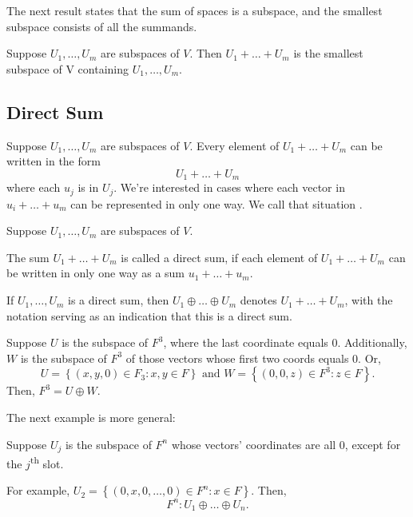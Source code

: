 The next result states that the sum of spaces is a subspace, and the smallest subspace consists of all the summands.
\begin{theorem}
  Suppose $U_{1}, \dots, U_{m}$ are subspaces of $V$. 
  Then $U_{1} + \dots + U_{m}$ is the smallest subspace of V containing $U_{1}, \dots, U_{m}$.
\end{theorem}

\subsection{Direct Sum}

Suppose $U_{1}, \dots, U_{m}$ are subspaces of $V$. 
Every element of $U_{1} + \dots + U_{m}$ can be written in the form 
\begin{equation*}
  U_{1} + \dots + U_{m}
\end{equation*}
where each $u_{j}$ is in $U_{j}$. 
We're interested in cases where each vector in $u_{i} + \dots + u_{m}$ can be represented in only one way.
We call that situation .

\begin{definition}
  Suppose $U_{1}, \dots, U_{m}$ are subspaces of $V$. 

  The sum $U_{1} + \dots + U_{m}$ is called a direct sum, if each element of $U_{1} + \dots + U_{m}$ can be written in only one way as a sum $u_{1} + \dots + u_{m}$.
  
  If $U_{1}, \dots, U_{m}$ is a direct sum, then $U_{1} \oplus \dots \oplus U_{m}$ denotes $U_{1} + \dots + U_{m}$,
  with the notation serving as an indication that this is a direct sum.
\end{definition}

\begin{example}
  Suppose $U$ is the subspace of $F^{3}$, where the last coordinate equals $0$.
  Additionally, $W$ is the subspace of $F^{3}$ of those vectors whose first two coords equals $0$. Or,
  \begin{equation*}
    U = \left\{(x, y, 0) \in F_{3} : x, y \in F\right\} \text{ and } W = \left\{(0, 0, z) \in F^{3} : z \in F\right\}.
  \end{equation*}
  Then, $F^{3} = U \oplus W$.
\end{example}

The next example is more general:

\begin{example}
  Suppose $U_{j}$ is the subspace of $F^{n}$ whose vectors' coordinates are all $0$, except for the $j$\textsuperscript{th} slot.

  For example, $U_{2} = \left\{(0, x, 0, \dots, 0) \in F^{n} : x \in F\right\}$. 
  Then,
  \begin{equation*}
    F^{n} : U_{1} \oplus \dots \oplus U_{n}.
  \end{equation*}
\end{example}

